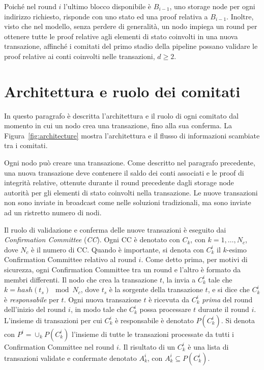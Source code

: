 Poiché nel round $i$ l'ultimo blocco disponibile è $B_{i-1}$, uno storage node per ogni indirizzo richiesto, risponde con uno stato ed una proof relativa a $B_{i-1}$. Inoltre, visto che nel modello, senza perdere di generalità, un nodo impiega un round per ottenere tutte le proof relative agli elementi di stato coinvolti in una nuova transazione, affinché i comitati del primo stadio della pipeline possano validare le proof relative ai conti coinvolti nelle transazioni, $d \geq 2$.

\section{Architettura e ruolo dei comitati}\label{sec:architettura}

In questo paragrafo è descritta l'architettura e il ruolo di ogni comitato dal momento in cui un nodo crea una transazione, fino alla sua conferma. La Figura~\ref{fig:architecture} mostra l'architettura e il flusso di informazioni scambiate tra i comitati.

Ogni nodo può creare una transazione. Come descritto nel paragrafo precedente, una nuova transazione deve contenere il saldo dei conti associati e le proof di integrità relative, ottenute durante il round precedente dagli storage node autorità per gli elementi di stato coinvolti nella transazione. Le nuove transazioni non sono inviate in broadcast come nelle soluzioni tradizionali, ma sono inviate ad un ristretto numero di nodi.

Il ruolo di validazione e conferma delle nuove transazioni è eseguito dai \emph{Confirmation Committee} (\emph{CC}). Ogni CC è denotato con $C_k$, con $k = 1, \dots, N_c$, dove $N_c$ è il numero di CC. Quando è importante, si denota con $C_k^i$ il $k$-esimo Confirmation Committee relativo al round $i$. Come detto prima, per motivi di sicurezza, ogni Confirmation Committee tra un round e l'altro è formato da membri differenti. Il nodo che crea la transazione $t$, la invia a $C_k^i$ tale che $k = hash(t_s) \mod N_c$, dove $t_s$ è la sorgente della transazione $t$, e si dice che $C_k^i$ è \emph{responsabile} per $t$. Ogni nuova transazione $t$ è ricevuta da $C_k^i$ \emph{prima} del round dell'inizio del round $i$, in modo tale che $C_k^i$ possa processare $t$ durante il round $i$. L'insieme di transazioni per cui $C_k^i$ è responsabile è denotato $P(C_k^i)$. Si denota con $P^i = \cup_k P(C_k^i)$ l'insieme di tutte le transazioni processate da tutti i Confirmation Committee nel round $i$. Il risultato di un $C_k^i$ è una lista di transazioni validate e confermate denotato $A_k^i$, con $A_k^i \subseteq P(C_k^i)$.

